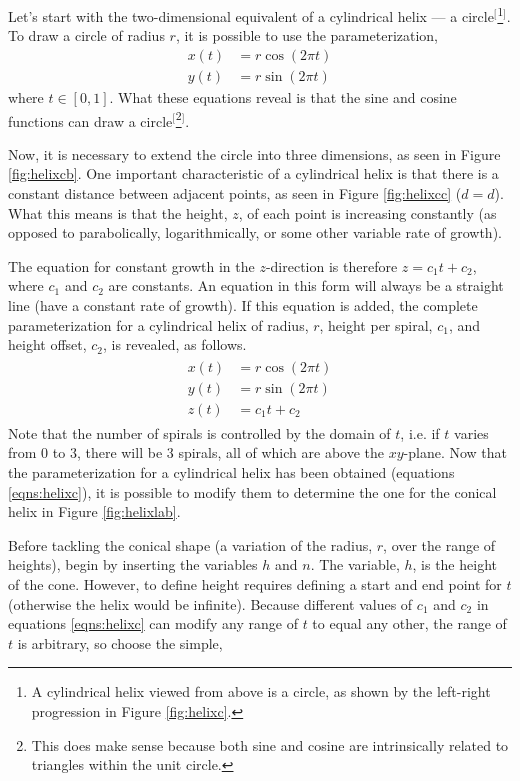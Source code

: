\documentclass{article}
\begin{document}
Let's start with the two-dimensional equivalent of a cylindrical helix --- a circle$^[$\footnote{A cylindrical helix viewed from above is a circle, as shown by the left-right progression in Figure \ref{fig:helixc}.}$^]$. To draw a circle of radius $r$, it is possible to use the parameterization,
\begin{align*}
    x(t) &= r\cos(2\pi t)\\
    y(t) &= r\sin(2\pi t)
\end{align*}
where $t\in[0,1]$. What these equations reveal is that the sine and cosine functions can draw a circle$^[$\footnote{This does make sense because both sine and cosine are intrinsically related to triangles within the unit circle.}$^]$.\par
Now, it is necessary to extend the circle into three dimensions, as seen in Figure \ref{fig:helixcb}. One important characteristic of a cylindrical helix is that there is a constant distance between adjacent points, as seen in Figure \ref{fig:helixcc} ($d=d$). What this means is that the height, $z$, of each point is increasing constantly (as opposed to parabolically, logarithmically, or some other variable rate of growth).\par
The equation for constant growth in the $z$-direction is therefore $z=c_1t+c_2$, where $c_1$ and $c_2$ are constants. An equation in this form will always be a straight line (have a constant rate of growth). If this equation is added, the complete parameterization for a cylindrical helix of radius, $r$, height per spiral, $c_1$, and height offset, $c_2$, is revealed, as follows.
\begin{align}\label{eqns:helixc}
    \begin{split}
        x(t) &= r\cos(2\pi t)\\
        y(t) &= r\sin(2\pi t)\\
        z(t) &= c_1t+c_2
    \end{split}
\end{align}
Note that the number of spirals is controlled by the domain of $t$, i.e. if $t$ varies from $0$ to $3$, there will be $3$ spirals, all of which are above the $xy$-plane. Now that the parameterization for a cylindrical helix has been obtained (equations \ref{eqns:helixc}), it is possible to modify them to determine the one for the conical helix in Figure \ref{fig:helixlab}.\par
Before tackling the conical shape (a variation of the radius, $r$, over the range of heights), begin by inserting the variables $h$ and $n$. The variable, $h$, is the height of the cone. However, to define height requires defining a start and end point for $t$ (otherwise the helix would be infinite). Because different values of $c_1$ and $c_2$ in equations \ref{eqns:helixc} can modify any range of $t$ to equal any other, the range of $t$ is arbitrary, so choose the simple,
\end{document}
